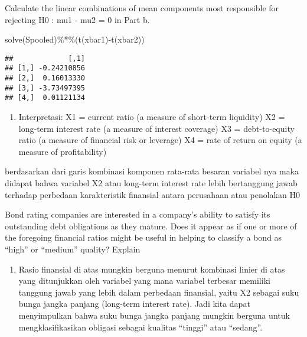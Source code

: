 \documentclass[
]{article}
\newenvironment{Shaded}{\begin{snugshade}}{\end{snugshade}}
\newcommand{\FunctionTok}[1]{\textcolor[rgb]{0.00,0.00,0.00}{#1}}
\newcommand{\NormalTok}[1]{#1}
\newcommand{\SpecialCharTok}[1]{\textcolor[rgb]{0.00,0.00,0.00}{#1}}
\providecommand{\tightlist}{%
  \setlength{\itemsep}{0pt}\setlength{\parskip}{0pt}}
\begin{document}
Calculate the linear combinations of mean components most responsible
for rejecting H0 : mu1 - mu2 = 0 in Part b.

\begin{Shaded}
\begin{Highlighting}[]
\FunctionTok{solve}\NormalTok{(Spooled)}\SpecialCharTok{\%*\%}\NormalTok{(}\FunctionTok{t}\NormalTok{(xbar1)}\SpecialCharTok{{-}}\FunctionTok{t}\NormalTok{(xbar2))}
\end{Highlighting}
\end{Shaded}

\begin{verbatim}
##             [,1]
## [1,] -0.24210856
## [2,]  0.16013330
## [3,] -3.73497395
## [4,]  0.01121134
\end{verbatim}

\begin{enumerate}
\def\labelenumi{\alph{enumi}.}
\setcounter{enumi}{2}
\tightlist
\item
  Interpretasi: X1 = current ratio (a measure of short-term liquidity)
  X2 = long-term interest rate (a measure of interest coverage) X3 =
  debt-to-equity ratio (a measure of financial risk or leverage) X4 =
  rate of return on equity (a measure of profitability)
\end{enumerate}

berdasarkan dari garis kombinasi komponen rata-rata besaran variabel nya
maka didapat bahwa variabel X2 atau long-term interest rate lebih
bertanggung jawab terhadap perbedaan karakteristik finansial antara
perusahaan atau penolakan H0

Bond rating companies are interested in a company's ability to satisfy
its outstanding debt obligations as they mature. Does it appear as if
one or more of the foregoing financial ratios might be useful in helping
to classify a bond as ``high'' or ``medium'' quality? Explain

\begin{enumerate}
\def\labelenumi{\alph{enumi}.}
\setcounter{enumi}{3}
\tightlist
\item
  Rasio finansial di atas mungkin berguna menurut kombinasi linier di
  atas yang ditunjukkan oleh variabel yang mana variabel terbesar
  memiliki tanggung jawab yang lebih dalam perbedaan finansial, yaitu X2
  sebagai suku bunga jangka panjang (long-term interest rate). Jadi kita
  dapat menyimpulkan bahwa suku bunga jangka panjang mungkin berguna
  untuk mengklasifikasikan obligasi sebagai kualitas ``tinggi'' atau
  ``sedang''.
\end{enumerate}
\end{document}

